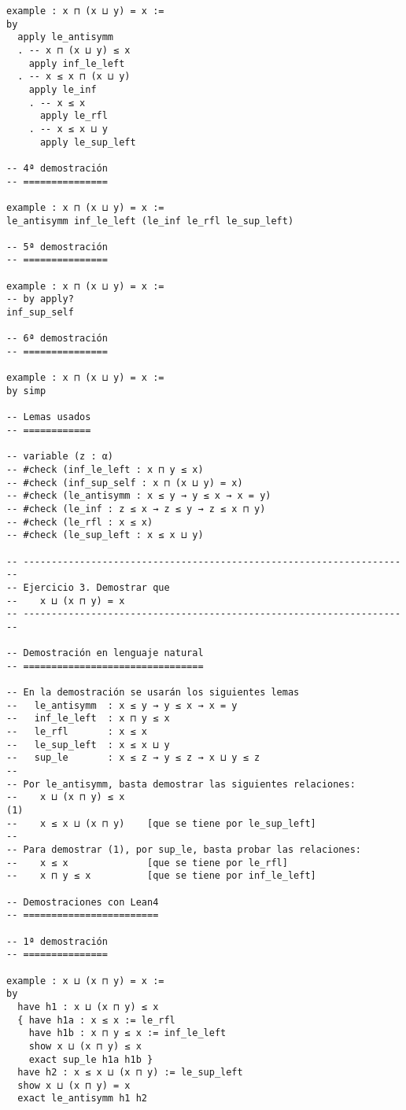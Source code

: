 \begin{verbatim}
example : x ⊓ (x ⊔ y) = x :=
by
  apply le_antisymm
  . -- x ⊓ (x ⊔ y) ≤ x
    apply inf_le_left
  . -- x ≤ x ⊓ (x ⊔ y)
    apply le_inf
    . -- x ≤ x
      apply le_rfl
    . -- x ≤ x ⊔ y
      apply le_sup_left

-- 4ª demostración
-- ===============

example : x ⊓ (x ⊔ y) = x :=
le_antisymm inf_le_left (le_inf le_rfl le_sup_left)

-- 5ª demostración
-- ===============

example : x ⊓ (x ⊔ y) = x :=
-- by apply?
inf_sup_self

-- 6ª demostración
-- ===============

example : x ⊓ (x ⊔ y) = x :=
by simp

-- Lemas usados
-- ============

-- variable (z : α)
-- #check (inf_le_left : x ⊓ y ≤ x)
-- #check (inf_sup_self : x ⊓ (x ⊔ y) = x)
-- #check (le_antisymm : x ≤ y → y ≤ x → x = y)
-- #check (le_inf : z ≤ x → z ≤ y → z ≤ x ⊓ y)
-- #check (le_rfl : x ≤ x)
-- #check (le_sup_left : x ≤ x ⊔ y)

-- ---------------------------------------------------------------------
-- Ejercicio 3. Demostrar que
--    x ⊔ (x ⊓ y) = x
-- ---------------------------------------------------------------------

-- Demostración en lenguaje natural
-- ================================

-- En la demostración se usarán los siguientes lemas
--   le_antisymm  : x ≤ y → y ≤ x → x = y
--   inf_le_left  : x ⊓ y ≤ x
--   le_rfl       : x ≤ x
--   le_sup_left  : x ≤ x ⊔ y
--   sup_le       : x ≤ z → y ≤ z → x ⊔ y ≤ z
--
-- Por le_antisymm, basta demostrar las siguientes relaciones:
--    x ⊔ (x ⊓ y) ≤ x                                                (1)
--    x ≤ x ⊔ (x ⊓ y)    [que se tiene por le_sup_left]
--
-- Para demostrar (1), por sup_le, basta probar las relaciones:
--    x ≤ x              [que se tiene por le_rfl]
--    x ⊓ y ≤ x          [que se tiene por inf_le_left]

-- Demostraciones con Lean4
-- ========================

-- 1ª demostración
-- ===============

example : x ⊔ (x ⊓ y) = x :=
by
  have h1 : x ⊔ (x ⊓ y) ≤ x
  { have h1a : x ≤ x := le_rfl
    have h1b : x ⊓ y ≤ x := inf_le_left
    show x ⊔ (x ⊓ y) ≤ x
    exact sup_le h1a h1b }
  have h2 : x ≤ x ⊔ (x ⊓ y) := le_sup_left
  show x ⊔ (x ⊓ y) = x
  exact le_antisymm h1 h2


\end{verbatim}
